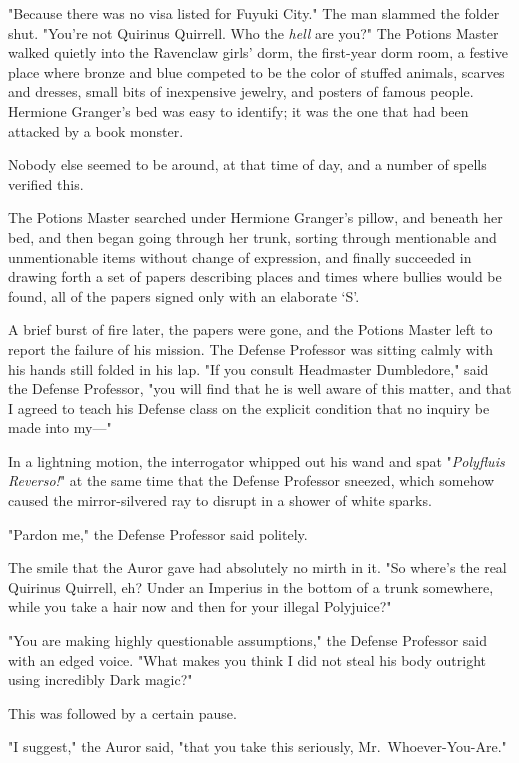 "Because there was no visa listed for Fuyuki City." The man slammed the folder
shut. "You're not Quirinus Quirrell. Who the \emph{hell} are you?"
\later
The Potions Master walked quietly into the Ravenclaw girls' dorm, the
first-year dorm room, a festive place where bronze and blue competed to be the
color of stuffed animals, scarves and dresses, small bits of inexpensive
jewelry, and posters of famous people. Hermione Granger's bed was easy to
identify; it was the one that had been attacked by a book monster.

Nobody else seemed to be around, at that time of day, and a number of spells
verified this.

The Potions Master searched under Hermione Granger's pillow, and beneath her
bed, and then began going through her trunk, sorting through mentionable and
unmentionable items without change of expression, and finally succeeded in
drawing forth a set of papers describing places and times where bullies would
be found, all of the papers signed only with an elaborate `S'.

A brief burst of fire later, the papers were gone, and the Potions Master left
to report the failure of his mission.
\later
The Defense Professor was sitting calmly with his hands still folded in his
lap. "If you consult Headmaster Dumbledore," said the Defense Professor, "you
will find that he is well aware of this matter, and that I agreed to teach his
Defense class on the explicit condition that no inquiry be made into my---"

In a lightning motion, the interrogator whipped out his wand and spat
"\emph{Polyfluis Reverso!}" at the same time that the Defense Professor
sneezed, which somehow caused the mirror-silvered ray to disrupt in a shower of
white sparks.

"Pardon me," the Defense Professor said politely.

The smile that the Auror gave had absolutely no mirth in it. "So where's the
real Quirinus Quirrell, eh? Under an Imperius in the bottom of a trunk
somewhere, while you take a hair now and then for your illegal Polyjuice?"

"You are making highly questionable assumptions," the Defense Professor said
with an edged voice. "What makes you think I did not steal his body outright
using incredibly Dark magic?"

This was followed by a certain pause.

"I suggest," the Auror said, "that you take this seriously,
Mr.~Whoever-You-Are."

